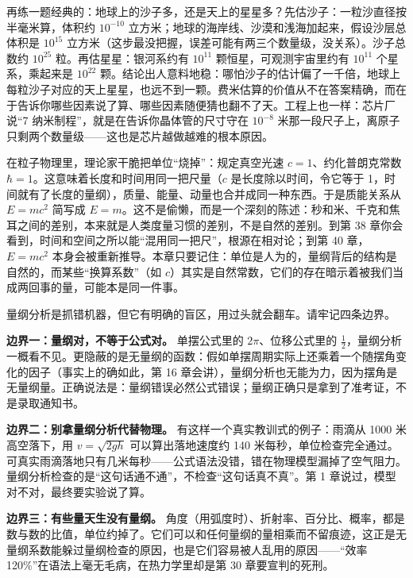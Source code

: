 再练一题经典的：地球上的沙子多，还是天上的星星多？先估沙子：一粒沙直径按半毫米算，体积约 $10^{-10}$ 立方米；地球的海岸线、沙漠和浅海加起来，假设沙层总体积是 $10^{15}$ 立方米（这步最没把握，误差可能有两三个数量级，没关系）。沙子总数约 $10^{25}$ 粒。再估星星：银河系约有 $10^{11}$ 颗恒星，可观测宇宙里约有 $10^{11}$ 个星系，乘起来是 $10^{22}$ 颗。结论出人意料地稳：哪怕沙子的估计偏了一千倍，地球上每粒沙子对应的天上星星，也远不到一颗。费米估算的价值从不在答案精确，而在于告诉你哪些因素说了算、哪些因素随便猜也翻不了天。工程上也一样：芯片厂说“7 纳米制程”，就是在告诉你晶体管的尺寸守在 $10^{-8}$ 米那一段尺子上，离原子只剩两个数量级——这也是芯片越做越难的根本原因。

\begin{challenge}
在粒子物理里，理论家干脆把单位“烧掉”：规定真空光速 $c = 1$、约化普朗克常数 $\hbar = 1$。这意味着长度和时间用同一把尺量（$c$ 是长度除以时间，令它等于 1，时间就有了长度的量纲），质量、能量、动量也合并成同一种东西。于是质能关系从 $E = mc^2$ 简写成 $E = m$。这不是偷懒，而是一个深刻的陈述：秒和米、千克和焦耳之间的差别，本来就是人类度量习惯的差别，不是自然的差别。到第 38 章你会看到，时间和空间之所以能“混用同一把尺”，根源在相对论；到第 40 章，$E=mc^2$ 本身会被重新推导。本章只要记住：单位是人为的，量纲背后的结构是自然的，而某些“换算系数”（如 $c$）其实是自然常数，它们的存在暗示着被我们当成两回事的量，可能本是同一件事。
\end{challenge}


量纲分析是抓错机器，但它有明确的盲区，用过头就会翻车。请牢记四条边界。

\textbf{边界一：量纲对，不等于公式对。} 单摆公式里的 $2\pi$、位移公式里的 $\frac{1}{2}$，量纲分析一概看不见。更隐蔽的是无量纲的函数：假如单摆周期实际上还乘着一个随摆角变化的因子（事实上的确如此，第 16 章会讲），量纲分析也无能为力，因为摆角是无量纲量。正确说法是：量纲错误必然公式错误；量纲正确只是拿到了准考证，不是录取通知书。

\textbf{边界二：别拿量纲分析代替物理。} 有这样一个真实教训式的例子：雨滴从 1000 米高空落下，用 $v = \sqrt{2gh}$ 可以算出落地速度约 140 米每秒，单位检查完全通过。可真实雨滴落地只有几米每秒——公式语法没错，错在物理模型漏掉了空气阻力。量纲分析检查的是“这句话通不通”，不检查“这句话真不真”。第 1 章说过，模型对不对，最终要实验说了算。

\textbf{边界三：有些量天生没有量纲。} 角度（用弧度时）、折射率、百分比、概率，都是数与数的比值，单位约掉了。它们可以和任何量纲的量相乘而不留痕迹，这正是无量纲系数能躲过量纲检查的原因，也是它们容易被人乱用的原因——“效率 120\%”在语法上毫无毛病，在热力学里却是第 30 章要宣判的死刑。

